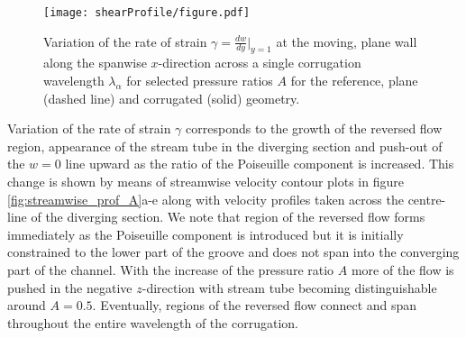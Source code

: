 \documentclass[lineno]{jfm}
\begin{document}
\begin{figure}
\centering
 \texttt{[image: shearProfile/figure.pdf]}  
 \caption{Variation of the rate of strain $\gamma=\frac{dw}{dy}|_{y=1}$ at the moving, plane wall along the spanwise $x$-direction across a single corrugation wavelength $\lambda_\alpha$ for selected pressure ratios $A$ for the reference, plane (dashed line) and corrugated (solid) geometry.}
 \label{fig:rate_of_strain}
\end{figure}
Variation of the rate of strain $\gamma$ corresponds to the growth of the reversed flow region, appearance of the stream tube in the diverging section and push-out of the $w=0$ line upward as the ratio of the Poiseuille component is increased.
This change is shown by means of streamwise velocity contour plots in figure \ref{fig:streamwise_prof_A}a-e along with velocity profiles taken across the centre-line of the diverging section.
We note that region of the reversed flow forms immediately as the Poiseuille component is introduced but it is initially constrained to the lower part of the groove and does not span into the converging part of the channel.
With the increase of the pressure ratio $A$ more of the flow is pushed in the negative $z$-direction with stream tube becoming distinguishable around $A=0.5$.
Eventually, regions of the reversed flow connect and span throughout the entire wavelength of the corrugation.
\end{document}
